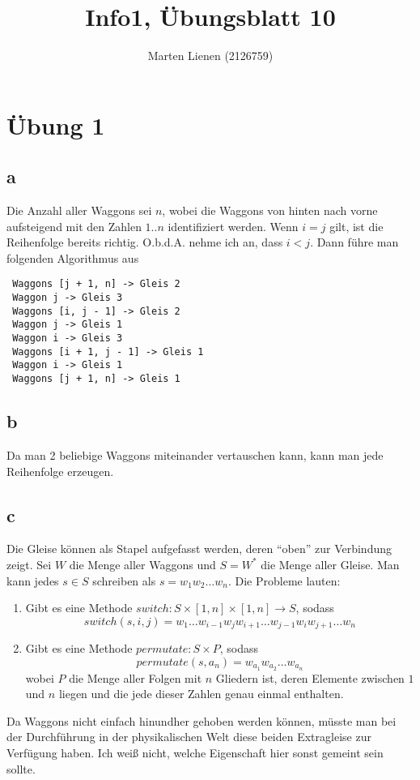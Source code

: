 \documentclass[a4paper,10pt]{article}
\title{Info1, Übungsblatt 10}
\author{Marten Lienen (2126759)}
\begin{document}
\maketitle

\section*{Übung 1}

\subsection*{a}

Die Anzahl aller Waggons sei $n$, wobei die Waggons von hinten nach vorne aufsteigend mit den Zahlen $1..n$ identifiziert werden.
Wenn $i = j$ gilt, ist die Reihenfolge bereits richtig.
O.b.d.A. nehme ich an, dass $i < j$.
Dann führe man folgenden Algorithmus aus
\begin{lstlisting}
 Waggons [j + 1, n] -> Gleis 2
 Waggon j -> Gleis 3
 Waggons [i, j - 1] -> Gleis 2
 Waggon j -> Gleis 1
 Waggon i -> Gleis 3
 Waggons [i + 1, j - 1] -> Gleis 1
 Waggon i -> Gleis 1
 Waggons [j + 1, n] -> Gleis 1
\end{lstlisting}

\subsection*{b}

Da man 2 beliebige Waggons miteinander vertauschen kann, kann man jede Reihenfolge erzeugen.

\subsection*{c}

Die Gleise können als Stapel aufgefasst werden, deren ``oben'' zur Verbindung zeigt.
Sei $W$ die Menge aller Waggons und $S = W^*$ die Menge aller Gleise.
Man kann jedes $s \in S$ schreiben als $s = w_1w_2\dots w_n$.
Die Probleme lauten:
\begin{enumerate}
 \item Gibt es eine Methode $switch: S \times [1, n] \times [1, n] \rightarrow S$, sodass
  \begin{equation}
   switch(s, i, j) = w_1 \dots w_{i - 1} w_j w_{i + 1} \dots w_{j - 1} w_i w_{j + 1} \dots w_n
  \end{equation}
 \item Gibt es eine Methode $permutate: S \times P$, sodass
  \begin{equation}
   permutate(s, a_n) = w_{a_1}w_{a_2} \dots w_{a_n}
  \end{equation}
  wobei $P$ die Menge aller Folgen mit $n$ Gliedern ist, deren Elemente zwischen $1$ und $n$ liegen und die jede dieser Zahlen genau einmal enthalten.
\end{enumerate}
Da Waggons nicht einfach hinundher gehoben werden können, müsste man bei der Durchführung in der physikalischen Welt diese beiden Extragleise zur Verfügung haben.
Ich weiß nicht, welche Eigenschaft hier sonst gemeint sein sollte.
\end{document}
